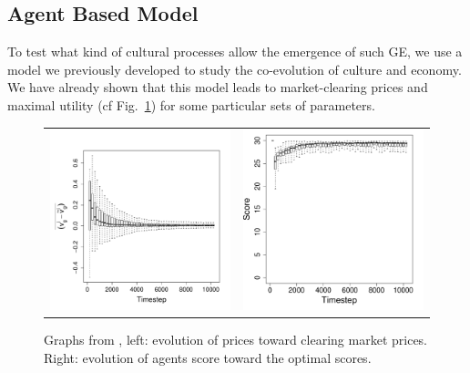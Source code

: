 \documentclass[a1paper,fontscale=.47]{baposter}
\begin{document}
\begin{poster}
{\subsection*{Agent Based Model}
To test what kind of cultural processes allow the emergence of such GE, we use a model we previously developed to study the co-evolution of culture and economy. We have already shown that this model leads to market-clearing prices and maximal utility (cf Fig.~\ref{fig:ratioEvol}) for some particular sets of parameters. 
	\vspace{-.75cm}
\begin{figure}[H]
	\begin{tabular}{cc}
		\includegraphics[width=.5\textwidth]{img/ClearingPriceDistanceEvolutionForTrade-G3N500.pdf}&
		\includegraphics[width=.45\textwidth]{img/ScoreEvolutionForTrade-G3N500.pdf} \\
	\end{tabular}
	\vspace{-.5cm}
	\caption{
	    \small
	    Graphs from \cite{carrignon2015modelingthecoevolutionoftradeandcultureinpastsocieties}, left: evolution of prices toward clearing market prices. Right: evolution of agents score toward the optimal scores.
	}
	\label{fig:ratioEvol}
\end{figure}

}
\end{poster}
\end{document}
